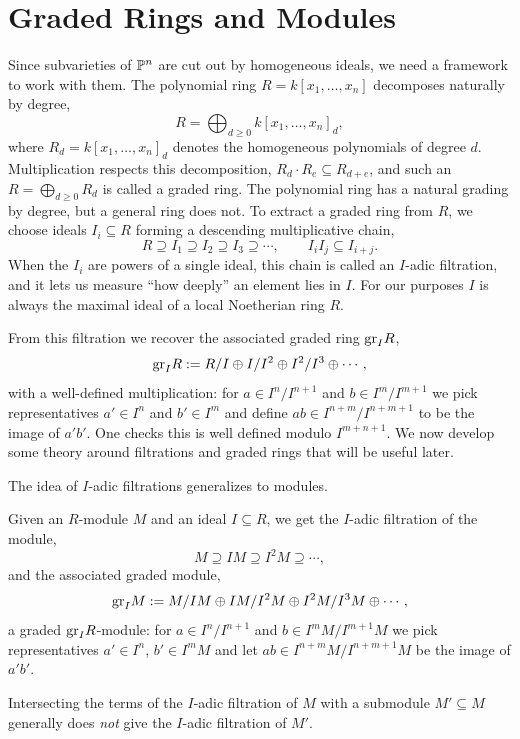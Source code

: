\documentclass[11pt]{article}
\begin{document}
\newpage

\section{Graded Rings and Modules}
Since subvarieties of $\P^n$ are cut out by homogeneous ideals, we need a framework to work with them. The polynomial ring $R = k[x_1, \ldots, x_n]$ decomposes naturally by degree,
\[R = \bigoplus_{d \geq 0} k[x_1, \ldots, x_n]_d,\]
where $R_d = k[x_1, \ldots, x_n]_d$ denotes the homogeneous polynomials of degree $d$. Multiplication respects this decomposition, $R_d \cdot R_e \subseteq R_{d+e}$, and such an $R = \bigoplus_{d \geq 0} R_d$ is called a graded ring. The polynomial ring has a natural grading by degree, but a general ring does not. To extract a graded ring from $R$, we choose ideals $I_i \subseteq R$ forming a descending multiplicative chain,
\[R \supseteq I_1 \supseteq I_2 \supseteq I_3 \supseteq \cdots, \qquad I_i I_j \subseteq I_{i+j}.\]
When the $I_i$ are powers of a single ideal, this chain is called an $I$-adic filtration, and it lets us measure ``how deeply'' an element lies in $I$. For our purposes $I$ is always the maximal ideal of a local Noetherian ring $R$.

From this filtration we recover the associated graded ring $\gr_I R$,
\[\gr_I R := R/I \oplus I/I^2 \oplus I^2/I^3 \oplus \cdots,\]
with a well-defined multiplication: for $a \in I^n/I^{n+1}$ and $b \in I^m/I^{m+1}$ we pick representatives $a' \in I^n$ and $b' \in I^m$ and define $ab \in I^{n+m}/I^{n+m+1}$ to be the image of $a'b'$. One checks this is well defined modulo $I^{m+n+1}$. We now develop some theory around filtrations and graded rings that will be useful later.

The idea of $I$-adic filtrations generalizes to modules.
\begin{definition}
    Given an $R$-module $M$ and an ideal $I \subseteq R$, we get the $I$-adic filtration of the module,
    \[M \supseteq IM \supseteq I^2M \supseteq \cdots,\]
    and the associated graded module,
    \[\gr_I M := M/IM \oplus IM/I^2M \oplus I^2M/I^3M \oplus \cdots,\]
    a graded $\gr_I R$-module: for $a \in I^n/I^{n+1}$ and $b \in I^mM/I^{m+1}M$ we pick representatives $a' \in I^n$, $b' \in I^mM$ and let $ab \in I^{n+m}M/I^{n+m+1}M$ be the image of $a'b'$.
\end{definition}

\begin{remark}
    Intersecting the terms of the $I$-adic filtration of $M$ with a submodule $M' \subseteq M$ generally does \emph{not} give the $I$-adic filtration of $M'$.
\end{remark}
\end{document}
